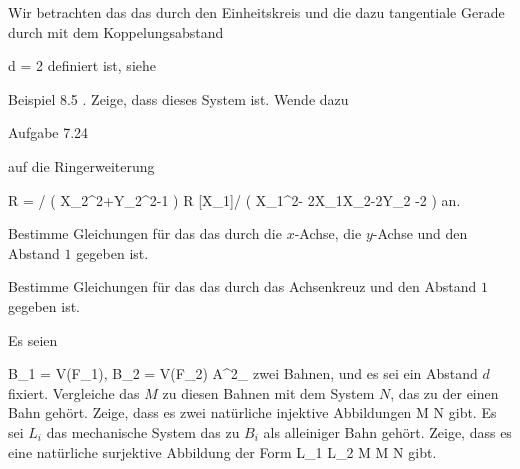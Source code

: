 {}
{





Wir betrachten das
das durch den Einheitskreis und die dazu tangentiale Gerade durch
 mit dem Koppelungsabstand

\mavergleichskette
{\vergleichskette
{ d
}
{ = }{ 2
}
{  }{
}
{    }{
}
{   }{
}
}
{}{}{}
definiert ist, siehe

Beispiel 8.5
.
Zeige, dass dieses System
ist. Wende dazu

Aufgabe 7.24

auf die Ringerweiterung

\mavergleichskettedisp
{\vergleichskette
{ R
}
{ =} { \R[X_2,Y_2]/ \left(  X_2^2+Y_2^2-1  \right)
}
{ \subseteq} { R [X_1]/ \left(  X_1^2- 2X_1X_2-2Y_2 -2    \right)
}
{ } {
}
{ } {
}
}
{}{}{}
an.





}
{} {}

{}
{





Bestimme Gleichungen für das
das durch die $x$-Achse, die $y$-Achse und den Abstand $1$ gegeben ist.





}
{} {}

{}
{





Bestimme Gleichungen für das
das durch das Achsenkreuz
 {} {}
und den Abstand $1$ gegeben ist.





}
{} {}

{}
{





Es seien

\mavergleichskettedisp
{\vergleichskette
{B_1 = V(F_1), B_2 = V(F_2)
}
{ \subseteq} { {\mathbb A}^{2}_{\R}
}
{ } {
}
{ } {
}
{ } {
}
}
{}{}{}
zwei Bahnen, und es sei ein Abstand $d$ fixiert. Vergleiche das
$M$ zu diesen Bahnen mit dem System $N$, das zu der einen Bahn
 gehört. Zeige, dass es zwei natürliche injektive Abbildungen
\maabbdisp {} { M } { N
} {}
gibt. Es sei $L_i$ das mechanische System das zu $B_i$ als alleiniger Bahn gehört. Zeige, dass es eine natürliche surjektive Abbildung der Form
\maabbdisp {} {L_1 \uplus L_2 \uplus M \uplus M} {N
} {}
gibt.





}
{} {}

